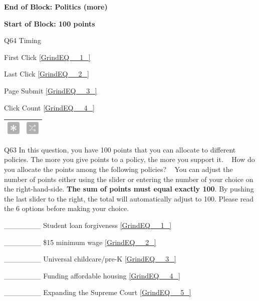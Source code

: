 \documentclass{article} %
\begin{document}
\noindent 

\noindent \textbf{End of Block: Politics (more)}

\noindent \textbf{}

\noindent \textbf{Start of Block: 100 points}

\noindent 

\noindent Q64 Timing

\noindent First Click  \eqref{GrindEQ__1_}

\noindent Last Click  \eqref{GrindEQ__2_}

\noindent Page Submit  \eqref{GrindEQ__3_}

\noindent Click Count  \eqref{GrindEQ__4_}

\noindent 

\noindent 

\begin{tabular}{|p{0.2in}|p{0.2in}|} \hline 
\includegraphics*[width=0.25in, height=0.25in]{image15} & \includegraphics*[width=0.25in, height=0.25in]{image16} \\ \hline 
\end{tabular}



\noindent Q63 In this question, you have 100 points that you can allocate to different policies. The more you give points to a policy, the more you support it.  ~  How do you allocate the points among the following policies?  ~  You can adjust the number of points either using the slider or entering the number of your choice on the right-hand-side. \textbf{The sum of points must equal exactly 100}. By pushing the last slider to the right, the total will automatically adjust to 100. Please read the 6 options before making your choice.

\noindent  \_\_\_\_\_\_\_ Student loan forgiveness \eqref{GrindEQ__1_}

\noindent  \_\_\_\_\_\_\_ \$15 minimum wage \eqref{GrindEQ__2_}

\noindent  \_\_\_\_\_\_\_ Universal childcare/pre-K \eqref{GrindEQ__3_}

\noindent  \_\_\_\_\_\_\_ Funding affordable housing \eqref{GrindEQ__4_}

\noindent  \_\_\_\_\_\_\_ Expanding the Supreme Court \eqref{GrindEQ__5_}
\end{document}
